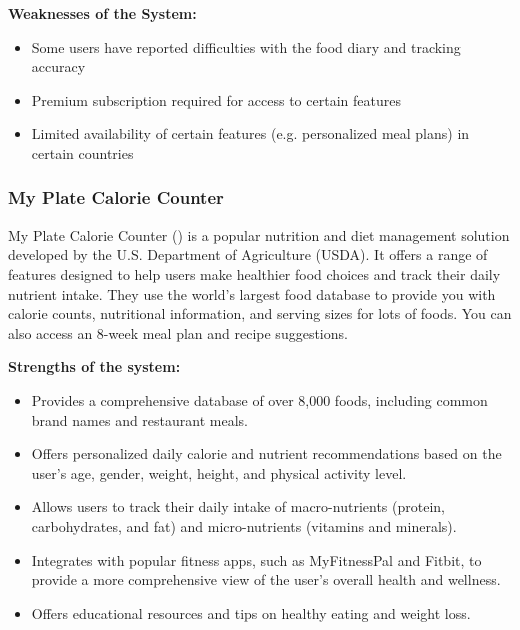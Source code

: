 \documentclass{article}
\begin{document}
\textbf{Weaknesses of the System:}
\begin{itemize}
\item Some users have reported difficulties with the food diary and tracking accuracy
\item Premium subscription required for access to certain features
\item Limited availability of certain features (e.g. personalized meal plans) in certain countries
\end{itemize}

\subsubsection{My Plate Calorie Counter}

My Plate Calorie Counter (\cite{myplate}) is a popular nutrition and diet management solution developed by the U.S. Department of Agriculture (USDA). It offers a range of features designed to help users make healthier food choices and track their daily nutrient intake. They use the world’s largest food database to provide you with calorie counts, nutritional information, and serving sizes for lots of foods. You can also access an 8-week meal plan and recipe suggestions.

\textbf{Strengths of the system:}
\begin{itemize}

\item Provides a comprehensive database of over 8,000 foods, including common brand names and restaurant meals.
\item Offers personalized daily calorie and nutrient recommendations based on the user's age, gender, weight, height, and physical activity level.
\item Allows users to track their daily intake of macro-nutrients (protein, carbohydrates, and fat) and micro-nutrients (vitamins and minerals).
\item Integrates with popular fitness apps, such as MyFitnessPal and Fitbit, to provide a more comprehensive view of the user's overall health and wellness.
\item Offers educational resources and tips on healthy eating and weight loss.

\end{itemize}
\end{document}

